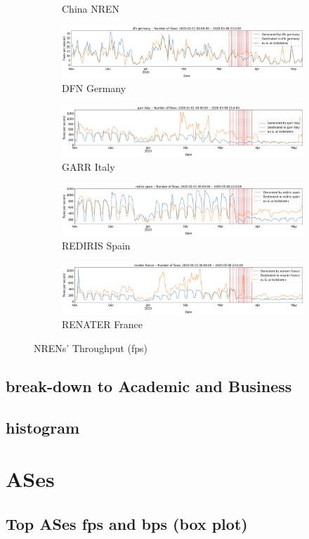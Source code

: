\documentclass[10pt, journal, letterpaper]{IEEEtran}
\begin{document}
\begin{figure}
\begin{subfigure}{\textwidth}
          \caption{China NREN}
          \label{fig:china_fps}
    \end{subfigure}
    \begin{subfigure}{\textwidth}
          \centering
          \includegraphics[width=\columnwidth]{img/dfn_fps.png}
          \caption{DFN Germany}
          \label{fig:dfn_fps}
    \end{subfigure}
    \begin{subfigure}{\textwidth}
          \centering
          \includegraphics[width=\columnwidth]{img/garr_fps.png}
          \caption{GARR Italy}
          \label{fig:garr_fps}
    \end{subfigure}
    \begin{subfigure}{\textwidth}
          \centering
          \includegraphics[width=\columnwidth]{img/rediris_fps.png}
          \caption{REDIRIS Spain}
          \label{fig:rediris_fps}
    \end{subfigure}
    \begin{subfigure}{\textwidth}
          \centering
          \includegraphics[width=\columnwidth]{img/renater_fps.png}
          \caption{RENATER France}
          \label{fig:renater_fps}
    \end{subfigure}
    \caption{NRENs' Throughput (fps)}
    \label{fig:nrens_fps}
\end{figure}

\subsection{break-down to Academic and Business}
\subsection{histogram}

\section{ASes}
\subsection{Top ASes fps and bps (box plot)}
\end{document}
